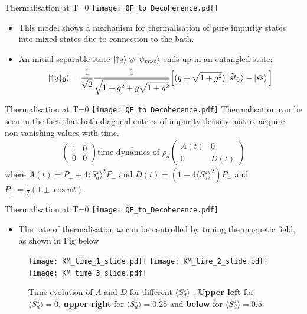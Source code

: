 \documentclass{beamer}
\begin{document}
\begin{frame}{Thermalisation at T=0  {\hfill\texttt{[image: QF\_to\_Decoherence.pdf]}\hfill}}
\begin{itemize}
\item This model shows a mechanism for \alert{thermalisation} of pure impurity states into mixed states due to connection to the bath. 
\item An initial separable state $ \ket{\uparrow_d} \otimes \ket{\psi_{rest}}$ ends up in an entangled state:
\begin{align*}
\ket{\uparrow_d \downarrow_0} = \frac{1}{\sqrt{2}} \frac{1}{\sqrt{1+g^2+g\sqrt{1+g^2}}} \Big[(g+\sqrt{1+g^2}) \ket{\Tilde{st}_0} - \ket{\Tilde{ss}} \Big]
\end{align*}
\end{itemize}
\end{frame}

\begin{frame}{Thermalisation at T=0  {\hfill\texttt{[image: QF\_to\_Decoherence.pdf]}\hfill}}
Thermalisation can be seen in the fact that both diagonal entries of \alert{impurity density matrix} acquire non-vanishing values with time. 
\begin{align*}
\begin{pmatrix}
1 & 0\\
0 & 0
\end{pmatrix} \underrightarrow{\text{time dynamics of }\rho_d} \begin{pmatrix}
A(t) & 0\\
0 & D(t)
\end{pmatrix}
\end{align*}
{\small where $A(t) = P_+ + 4 \langle S_d^z \rangle^2  P_-$ and $D(t) =(1 - 4 \langle S_d^z \rangle^2)  P_-$ and $P_{\pm} = \frac{1}{2} \left( 1 \pm \cos wt \right)$.}
\end{frame}


\begin{frame}{Thermalisation at T=0  {\hfill\texttt{[image: QF\_to\_Decoherence.pdf]}\hfill}}
\begin{itemize}
\item {\small The rate of thermalisation $\mathbf{\omega}$ can be controlled by tuning the magnetic field, as shown in Fig below}
\end{itemize}
\begin{figure}[!ht]
    \centering
    \texttt{[image: KM\_time\_1\_slide.pdf]}
    \texttt{[image: KM\_time\_2\_slide.pdf]}
    \texttt{[image: KM\_time\_3\_slide.pdf]}
    \caption{{\small Time evolution of $A$ and $D$ for different $\langle S_d^z \rangle$ : \textbf{Upper left} for $\langle S_d^z \rangle =0 $, \textbf{upper right} for $\langle S_d^z \rangle = 0.25$ and \textbf{below} for $\langle S_d^z \rangle=0.5$.}}
    \label{0okm}
\end{figure}
\end{frame}
\end{document}
